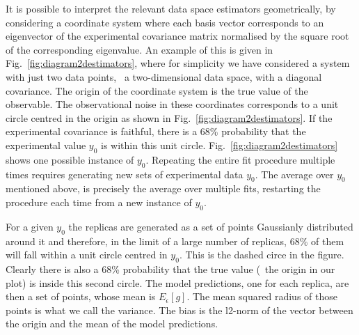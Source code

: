It is possible to interpret the relevant data space estimators geometrically, by
considering a coordinate system where each basis vector corresponds to an
eigenvector of the experimental covariance matrix normalised by the square root
of the corresponding eigenvalue. An example of this is given in
Fig.~\ref{fig:diagram2destimators}, where for simplicity we have considered a
system with just two data points, \ie\ a two-dimensional data space, with a
diagonal covariance. The origin of the coordinate system is the true value of
the observable. The observational noise in these coordinates corresponds to a
unit circle centred in the origin as shown in
Fig.~\ref{fig:diagram2destimators}. If the experimental covariance is faithful,
there is a 68\%  probability that the experimental value $y_0$ is within this
unit circle. Fig.~\ref{fig:diagram2destimators} shows one possible instance of
$y_0$. Repeating the entire fit procedure multiple times requires generating new
sets of experimental data $y_0$. The average over $y_0$ mentioned above, is
precisely the average over multiple fits, restarting the procedure each time
from a new instance of $y_0$.

For a given $y_0$ the replicas are generated as a set of points Gaussianly
distributed around it and therefore, in the limit of a large number of replicas,
68\% of them will fall within a unit circle centred in $y_0$. This is the dashed
circe in the figure. Clearly there is also a 68\% probability that the true
value (\ie\ the origin in our plot) is inside this second circle. The model
predictions, one for each replica, are then a set of points, whose mean is
$E_\epsilon[g]$. The mean squared radius of those points is what we call the
variance. The bias is the l2-norm of the vector between the origin and the mean
of the model predictions. 

